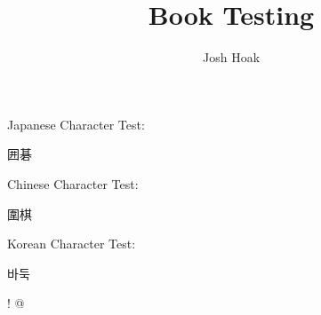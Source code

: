 \documentclass{book}
\newenvironment{Korean}{\CJKfamily{mj}}{}
\begin{document}
\title{Book Testing}
\author{Josh Hoak}
\maketitle

Japanese Character Test:
\begin{CJK}{UTF8}{min}
囲碁
\end{CJK}

Chinese Character Test:
\begin{CJK}{UTF8}{min}
圍棋
\end{CJK}

Korean Character Test:
\begin{CJK}{UTF8}{}
\begin{Korean}
바둑
\end{Korean}
\end{CJK}

{\gooegb ! @}
\end{document}

